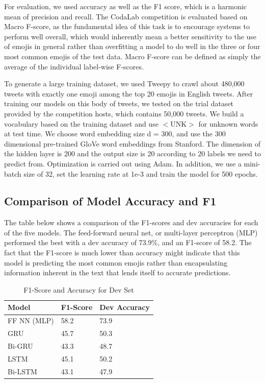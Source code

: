 \documentclass[11pt,a4paper]{article}
\begin{document}
For evaluation, we used accuracy as well as the F1 score, which is a harmonic mean of precision and recall. The CodaLab competition is evaluated based on Macro F-score, as the fundamental idea of this task is to encourage systems to perform well overall, which would inherently mean a better sensitivity to the use of emojis in general rather than overfitting a model to do well in the  three or four most common emojis of the test data. Macro F-score can be defined as simply the average of the individual label-wise F-scores.


\par
To generate a large training dataset, we used Tweepy to crawl about 480,000 tweets with exactly one emoji among the top 20 emojis in English tweets. After training our models on this body of tweets, we tested on the trial dataset provided by the competition hosts, which contains 50,000 tweets. We build a vocabulary based on the training dataset and use $<$UNK$>$ for unknown words at test time. We choose word embedding size d = 300, and use the 300 dimensional pre-trained GloVe word embeddings from Stanford. The dimension of the hidden layer is 200 and the output size is 20 according to 20 labels we need to predict from. Optimization is carried out using Adam. In addition, we use a mini-batch size of 32, set the learning rate at 1e-3 and train the model for 500 epochs.


\subsection{Comparison of Model Accuracy and F1}
The table below shows a comparison of the F1-scores and dev accuracies for each of the five models. The feed-forward neural net, or multi-layer perceptron (MLP) performed the best with a dev accuracy of 73.9\%, and an F1-score of 58.2. The fact that the F1-score is much lower than accuracy might indicate that this model is predicting the most common emojis rather than encapsulating information inherent in the text that lends itself to accurate predictions.
	\begin{table}[htp]
		\centering
		\caption{F1-Score and Accuracy for Dev Set}
		\label{my-label}
		\begin{tabular}{@{}lll@{}}
			\toprule
			Model       & F1-Score & Dev Accuracy \\ \midrule
			FF NN (MLP) & 58.2     & 73.9         \\
			GRU         & 45.7     & 50.3         \\
			Bi-GRU      & 43.3        & 48.7            \\
			LSTM        & 45.1     & 50.2         \\
			Bi-LSTM     & 43.1       & 47.9            \\ \bottomrule
		\end{tabular}
	\end{table}
\end{document}
